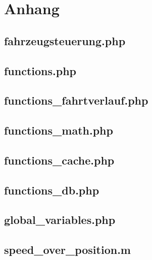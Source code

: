 
\section{Anhang}

\subsection{fahrzeugsteuerung.php} \label{anhangMain}



\newpage

\subsection{functions.php} \label{sortFunctions}



\newpage

\subsection{functions\_fahrtverlauf.php} \label{fahrtverlaufFunctions}



\newpage

\subsection{functions\_math.php} \label{functionsMath}



\newpage

\subsection{functions\_cache.php} \label{cacheFunctionsOwn}



\newpage

\subsection{functions\_db.php} \label{functionsDatabase}



\newpage

\subsection{global\_variables.php} \label{anhangGlobalVariables}



\newpage

\subsection{speed\_over\_position.m} \label{anhangMatlab}


